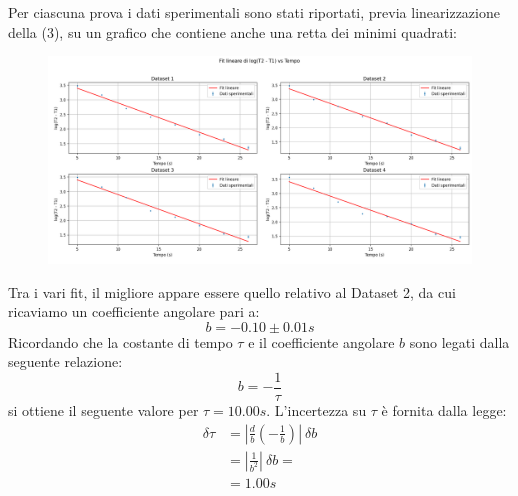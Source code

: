 Per ciascuna prova i dati sperimentali sono stati riportati, previa linearizzazione della (3), su un grafico che contiene anche una retta dei minimi quadrati:
\begin{figure}[H]
	\centering
	\includegraphics[width=1\textwidth]{./graph.png}
	\caption{}
\end{figure} 
Tra i vari fit, il migliore appare essere quello relativo al Dataset 2, da cui ricaviamo un coefficiente angolare pari a:
\begin{equation}
    b = -0.10 \pm 0.01 s
\end{equation}
Ricordando che la costante di tempo $\tau$ e il coefficiente angolare $b$ sono legati dalla seguente relazione:
\begin{equation}
    b = -\frac{1}{\tau}
\end{equation}
si ottiene il seguente valore per $\tau = 10.00s$. L'incertezza su $\tau$ è fornita dalla legge:
\begin{align}
    \delta \tau &= \left| \frac{d}{b}(-\frac{1}{b}) \right| \ \delta b  \\
    &= \left| \frac{1}{b^2} \right| \ \delta b = \\
    &= 1.00s
\end{align}